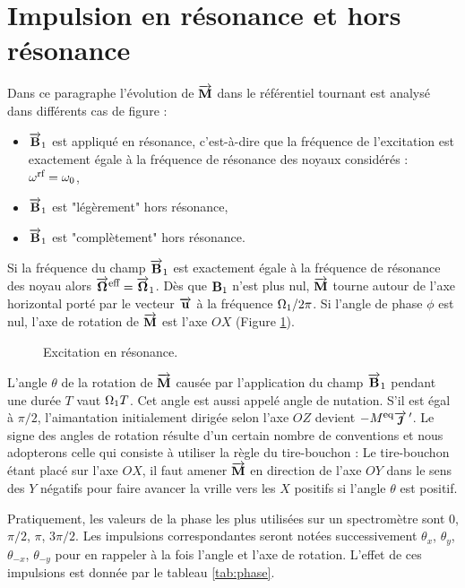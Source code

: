 \section{Impulsion en résonance et hors résonance}
Dans ce paragraphe l'évolution de $\overrightarrow{\mathbf{M}}$ dans le référentiel tournant est analysé dans
différents cas de figure :
\begin{itemize}
\item $\overrightarrow{\mathbf{B}}_1$ est appliqué en résonance, c'est-à-dire que la fréquence de l'excitation
est exactement égale à la fréquence de résonance des noyaux considérés :
$\omega^{\mbox{\footnotesize{rf}}} = \omega_0$,
\item $\overrightarrow{\mathbf{B}}_1$ est "légèrement" hors résonance,
\item $\overrightarrow{\mathbf{B}}_1$ est "complètement" hors résonance.
\end{itemize}

Si la fréquence du champ $\overrightarrow{\mathbf{B}}_1$ est exactement égale à la fréquence de résonance des
noyau alors $\overrightarrow{\mathbf{\Omega}}^{\mbox{\footnotesize{eff}}} = \overrightarrow{\mathbf{\Omega}}_1$.
Dès que $\mathbf{B}_1$ n'est plus nul, $\overrightarrow{\mathbf{M}}$ tourne autour de
l'axe horizontal porté par le vecteur $\overrightarrow{\mathbf{u}}$ à la fréquence $\Omega_1/2\pi$.
Si l'angle de phase $\phi$ est nul, l'axe de rotation de $\overrightarrow{\mathbf{M}}$ est l'axe $OX$
(Figure \ref{fig:onres}).

\begin{figure}[hbt]
\begin{center}
\end{center}
\caption{Excitation en résonance.}
\label{fig:onres}
\end{figure}

L'angle $\theta$ de la rotation de $\overrightarrow{\mathbf{M}}$ causée par l'application du champ $\overrightarrow{\mathbf{B}}_1$
pendant une durée $T$ vaut $\Omega_1 T$.
Cet angle est aussi appelé angle de nutation.
S'il est égal à $\pi/2$, l'aimantation initialement dirigée selon l'axe $OZ$
devient $-M^{\mbox{\footnotesize{eq}}}\overrightarrow{\boldsymbol{\jmath}} \, '$.
Le signe des angles de rotation résulte d'un certain nombre de conventions et
nous adopterons celle qui consiste à utiliser la règle du tire-bouchon :
Le tire-bouchon étant placé sur l'axe $OX$, il faut amener $\overrightarrow{\mathbf{M}}$ en direction
de l'axe $OY$ dans le sens des $Y$ négatifs pour faire avancer la vrille vers les $X$
positifs si l'angle $\theta$ est positif.

Pratiquement, les valeurs de la phase les plus utilisées sur un spectromètre
sont 0, $\pi/2$, $\pi$, $3\pi/2$.
Les impulsions correspondantes seront notées successivement $\theta_x$,
$\theta_y$, $\theta_{-x}$, $\theta_{-y}$ pour en rappeler
à la fois l'angle et l'axe de rotation.
L'effet de ces impulsions est donnée par le tableau \ref{tab:phase}.


